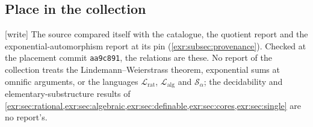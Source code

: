 \documentclass[11pt,letterpaper]{article}
\numberwithin{equation}{section}
\theoremstyle{definition}
\theoremstyle{remark}
\newcommand{\Lrat}{\mathcal L_{\mathrm{rat}}}
\newcommand{\Lalg}{\mathcal L_{\mathrm{alg}}}
\newcommand{\wtag}{\textup{[write]}}%
\begin{document}
\subsection{Place in the collection}\label{exr:sec:collection}

\wtag{} The source compared itself with the catalogue, the quotient report
and the exponential-automorphism report at its pin
(\cref{exr:subsec:provenance}). Checked at the placement commit
\nolinkurl{aa9c891}, the relations are these. No report of the collection
treats the Lindemann--Weierstrass theorem, exponential sums at omnific
arguments, or the languages $\Lrat$, $\Lalg$ and $\mathcal S_\alpha$; the
decidability and elementary-substructure results of
\cref{exr:sec:rational,exr:sec:algebraic,exr:sec:definable,exr:sec:cores,exr:sec:single}
are no report's.
\end{document}
